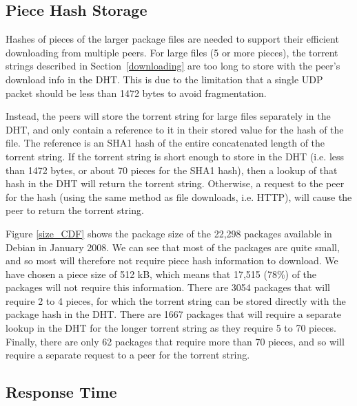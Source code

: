 \documentclass[conference]{IEEEtran}
\begin{document}
\subsection{Piece Hash Storage}
\label{pieces}

Hashes of pieces of the larger package files are needed to support
their efficient downloading from multiple peers.
For large files (5 or more pieces), the torrent strings described in
Section~\ref{downloading}
are too long to store with the peer's download info in the DHT. This
is due to the limitation that a single UDP packet should be less
than 1472 bytes to avoid fragmentation.

Instead, the peers will store the torrent string for large files
separately in the DHT, and only contain a reference to it in their
stored value for the hash of the file. The reference is an SHA1 hash
of the entire concatenated length of the torrent string. If the
torrent string is short enough to store in the DHT (i.e. less than
1472 bytes, or about 70 pieces for the SHA1 hash), then a lookup of
that hash in the DHT will return the torrent string. Otherwise, a
request to the peer for the hash (using the same method as file
downloads, i.e. HTTP), will cause the peer to return the torrent
string.

Figure \ref{size_CDF} shows the package size of the 22,298 packages
available in Debian in January 2008. We can see that most of the
packages are quite small, and so most will therefore not require
piece hash information to download. We have chosen a piece
size of 512 kB, which means that 17,515 (78\%) of the packages will
not require this information. There are 3054 packages that will
require 2 to 4 pieces, for which the torrent string can be stored
directly with the package hash in the DHT. There are 1667 packages
that will require a separate lookup in the DHT for the longer
torrent string as they require 5 to 70 pieces. Finally, there are
only 62 packages that require more than 70 pieces, and so will
require a separate request to a peer for the torrent string.

\subsection{Response Time}
\label{response_time}
\end{document}
